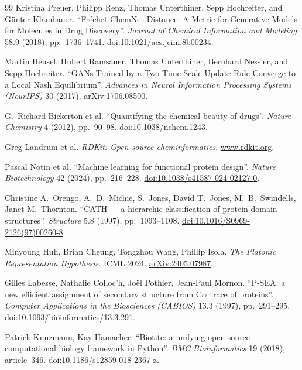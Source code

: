 \documentclass[12pt,a4paper,twoside]{report}
\begin{document}
\begin{thebibliography}{99}
Kristina Preuer, Philipp Renz, Thomas Unterthiner, Sepp Hochreiter, and G\"unter Klambauer.
``Fr\'echet ChemNet Distance: A Metric for Generative Models for Molecules in Drug Discovery''.
\textit{Journal of Chemical Information and Modeling} 58.9 (2018), pp.~1736--1741.
\href{https://doi.org/10.1021/acs.jcim.8b00234}{doi:10.1021/acs.jcim.8b00234}.

Martin Heusel, Hubert Ramsauer, Thomas Unterthiner, Bernhard Nessler, and Sepp Hochreiter.
``GANs Trained by a Two Time-Scale Update Rule Converge to a Local Nash Equilibrium''.
\textit{Advances in Neural Information Processing Systems (NeurIPS)} 30 (2017).
\href{https://arxiv.org/abs/1706.08500}{arXiv:1706.08500}.

G.~Richard Bickerton et al.
``Quantifying the chemical beauty of drugs''.
\textit{Nature Chemistry} 4 (2012), pp.~90--98.
\href{https://doi.org/10.1038/nchem.1243}{doi:10.1038/nchem.1243}.

Greg Landrum et al.
\textit{RDKit: Open-source cheminformatics}.
\href{https://www.rdkit.org}{www.rdkit.org}.

Pascal Notin et al.
``Machine learning for functional protein design''.
\textit{Nature Biotechnology} 42 (2024), pp.~216--228.
\href{https://doi.org/10.1038/s41587-024-02127-0}{doi:10.1038/s41587-024-02127-0}.


Christine A.~Orengo, A.~D.~Michie, S.~Jones, David T.~Jones, M.~B.~Swindells, Janet M.~Thornton.
``CATH --- a hierarchic classification of protein domain structures''.
\textit{Structure} 5.8 (1997), pp.~1093--1108.
\href{https://doi.org/10.1016/S0969-2126(97)00260-8}{doi:10.1016/S0969-2126(97)00260-8}.

Minyoung Huh, Brian Cheung, Tongzhou Wang, Phillip Isola.
\textit{The Platonic Representation Hypothesis}. ICML 2024.
\href{https://arxiv.org/abs/2405.07987}{arXiv:2405.07987}.


Gilles Labesse, Nathalie Colloc'h, Jo\"el Pothier, Jean-Paul Mornon.
``P-SEA: a new efficient assignment of secondary structure from C$\alpha$ trace of proteins''.
\textit{Computer Applications in the Biosciences (CABIOS)} 13.3 (1997), pp.~291--295.
\href{https://doi.org/10.1093/bioinformatics/13.3.291}{doi:10.1093/bioinformatics/13.3.291}.

Patrick Kunzmann, Kay Hamacher.
``Biotite: a unifying open source computational biology framework in Python''.
\textit{BMC Bioinformatics} 19 (2018), article~346.
\href{https://doi.org/10.1186/s12859-018-2367-z}{doi:10.1186/s12859-018-2367-z}.

\end{thebibliography}
\end{document}
